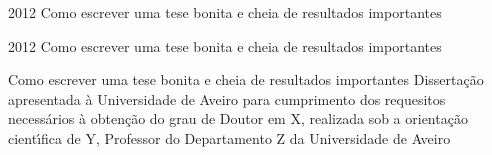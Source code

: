 \documentclass[11pt,twoside,a4paper]{report}
\def\ThesisYear{2012}
\begin{document}
%
%

\TitlePage
         {\ThesisYear}
        {Como escrever uma tese bonita e cheia de resultados importantes}
\EndTitlePage
\titlepage\ \endtitlepage%

\TitlePage
         {\ThesisYear}
        {Como escrever uma tese bonita e cheia de resultados importantes}
\EndTitlePage
\titlepage\ \endtitlepage %


%
%

\TitlePage
  \HEADER{}{\ThesisYear}
        {Como escrever uma tese bonita e cheia de resultados importantes}
  \vspace*{15mm}
  \TEXT{}
       {Disserta\c c\~ao apresentada \`a Universidade de Aveiro para cumprimento dos requesitos
        necess\'arios \`a obten\c c\~ao do grau de Doutor em X, realizada sob a orienta\c c\~ao
        cient\'\i fica de Y, Professor do Departamento Z da Universidade de Aveiro}
\EndTitlePage
\titlepage\ \endtitlepage %
\end{document}

